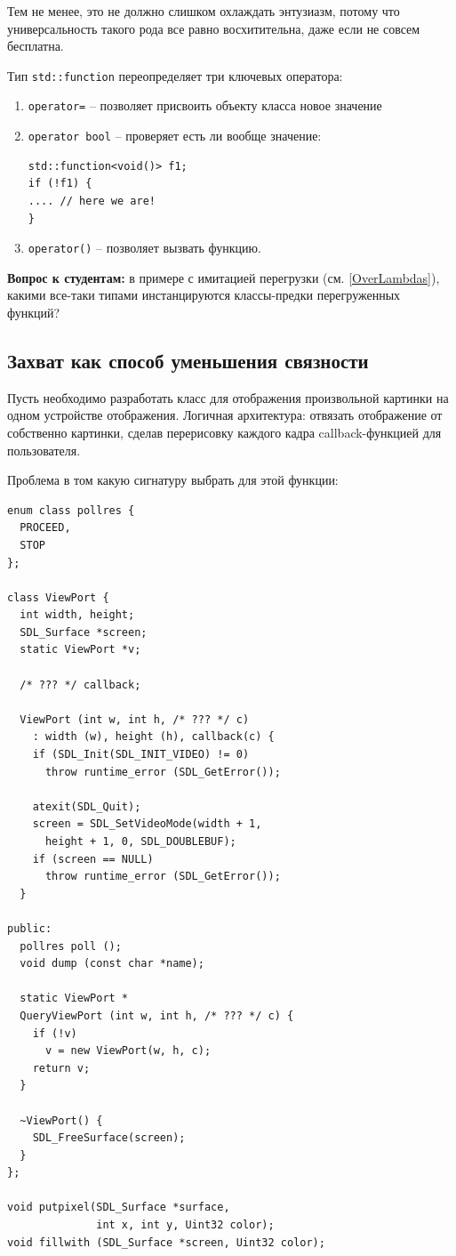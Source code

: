 \documentclass[a4paper,12pt,oneside]{book}
\begin{document}
Тем не менее, это не должно слишком охлаждать энтузиазм, потому что универсальность такого рода все равно восхитительна, даже если не совсем бесплатна.

Тип \lstinline!std::function! переопределяет три ключевых оператора:

\begin{enumerate}
\item\lstinline!operator=! -- позволяет присвоить объекту класса новое значение

\item\lstinline!operator bool! -- проверяет есть ли вообще значение:

\begin{lstlisting}
std::function<void()> f1;
if (!f1) {
.... // here we are!
}
\end{lstlisting}

\item\lstinline!operator()! -- позволяет вызвать функцию.
\end{enumerate}

\textbf{Вопрос к студентам:} в примере с имитацией перегрузки (см. \ref{OverLambdas}), какими все-таки типами инстанцируются классы-предки перегруженных функций?

\subsection{Захват как способ уменьшения связности}

Пусть необходимо разработать класс для отображения произвольной картинки на одном устройстве отображения. Логичная архитектура: отвязать отображение от собственно картинки, сделав перерисовку каждого кадра callback-функцией для пользователя.

Проблема в том какую сигнатуру выбрать для этой функции:

\begin{lstlisting}
enum class pollres {
  PROCEED,
  STOP
};

class ViewPort {
  int width, height;
  SDL_Surface *screen;
  static ViewPort *v;

  /* ??? */ callback;

  ViewPort (int w, int h, /* ??? */ c)
    : width (w), height (h), callback(c) {
    if (SDL_Init(SDL_INIT_VIDEO) != 0)
      throw runtime_error (SDL_GetError());

    atexit(SDL_Quit);
    screen = SDL_SetVideoMode(width + 1, 
      height + 1, 0, SDL_DOUBLEBUF);
    if (screen == NULL)
      throw runtime_error (SDL_GetError());
  }

public:
  pollres poll ();
  void dump (const char *name);

  static ViewPort *
  QueryViewPort (int w, int h, /* ??? */ c) {
    if (!v)
      v = new ViewPort(w, h, c);
    return v;
  }

  ~ViewPort() {
    SDL_FreeSurface(screen);
  }
};

void putpixel(SDL_Surface *surface, 
              int x, int y, Uint32 color);
void fillwith (SDL_Surface *screen, Uint32 color);
\end{lstlisting}
\end{document}
